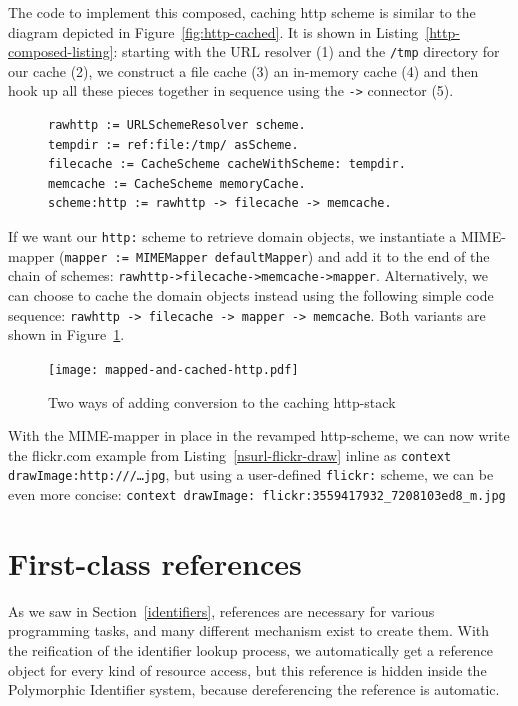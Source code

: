 \documentclass[preprint]{sigplanconf}
\begin{document}
The code to implement this composed, caching http scheme is similar 
to the diagram depicted in Figure~\ref{fig:http-cached}.  It is shown in Listing~\ref{http-composed-listing}:  
starting with the URL resolver (1) and the {\tt /tmp} directory for our cache (2), we construct
a file cache (3) an in-memory cache (4) and then hook up all these pieces together
in sequence using the {\tt ->} connector (5).

\begin{figure}[htbp]
\begin{lstlisting}[style=numbers,label=http-composed-listing,caption=Code for caching http stack.]
rawhttp := URLSchemeResolver scheme.
tempdir := ref:file:/tmp/ asScheme.
filecache := CacheScheme cacheWithScheme: tempdir.
memcache := CacheScheme memoryCache.
scheme:http := rawhttp -> filecache -> memcache.
\end{lstlisting}
\end{figure}

If we want our {\tt http:} scheme to retrieve domain objects, we instantiate a MIME-mapper
({\tt mapper := MIMEMapper defaultMapper}) and add it to the end of the chain of schemes: 
{\tt rawhttp->filecache->memcache->mapper}.  Alternatively, we can choose to cache the
domain objects instead using the following simple code sequence: {\tt rawhttp -> filecache -> mapper -> memcache}.
Both variants are shown in Figure~\ref{http-cached-converted}.


\begin{figure}[htbp]
\centering
\texttt{[image: mapped-and-cached-http.pdf]}
\caption{Two ways of adding conversion to the caching http-stack}
\label{http-cached-converted}
\end{figure}


With the MIME-mapper in place in the revamped http-scheme, we can now 
write the flickr.com example from Listing~\ref{nsurl-flickr-draw} inline as {\tt context drawImage:http:///{\ldots}jpg},
but using a user-defined {\tt flickr:} scheme, we can be even more concise:  
{\tt context drawImage: flickr:3559417932\_7208103ed8\_m.jpg}


\section{First-class references}
\label{references}

As we saw in Section~\ref{identifiers}, references are necessary for various programming tasks,
and many different mechanism exist to create them.   With the reification of the identifier lookup
process, we automatically get a reference object for every kind of resource access, but this
reference is hidden inside the Polymorphic Identifier system, because dereferencing the
reference is automatic.
\end{document}
